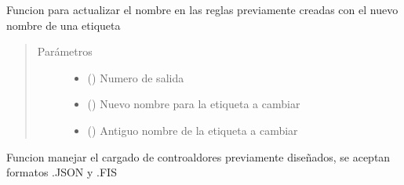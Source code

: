 \documentclass[letterpaper,10pt,spanish]{sphinxmanual}
\begin{document}
\begin{fulllineitems}
\label{\detokenize{codigos/FuzzyHandler:FuzzyHandler.actualizar_RulesEtiquetas_out}}
Funcion para actualizar el nombre en las reglas previamente creadas con el nuevo nombre de una etiqueta
\begin{quote}\begin{description}
\item[{Parámetros}] \leavevmode\begin{itemize}
\item {} 
 () \textendash{} Numero de salida

\item {} 
 () \textendash{} Nuevo nombre para la etiqueta a cambiar

\item {} 
 () \textendash{} Antiguo nombre de la etiqueta a cambiar

\end{itemize}

\end{description}\end{quote}

\end{fulllineitems}


\begin{fulllineitems}
\label{\detokenize{codigos/FuzzyHandler:FuzzyHandler.cargar_controlador}}
Funcion manejar el cargado de controaldores previamente diseñados, se aceptan formatos .JSON y .FIS

\end{fulllineitems}

\end{document}
